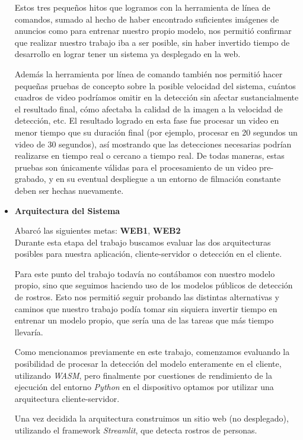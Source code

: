 \documentclass[a4paper]{article}
\begin{document}
\begin{itemize}
Estos tres pequeños hitos que logramos con la herramienta de línea de comandos, sumado al hecho de haber encontrado suficientes imágenes de anuncios como para entrenar nuestro propio modelo, nos permitió confirmar que realizar nuestro trabajo iba a ser posible, sin haber invertido tiempo de desarrollo en lograr tener un sistema ya desplegado en la web.

Además la herramienta por línea de comando también nos permitió hacer pequeñas pruebas de concepto sobre la posible velocidad del sistema, cuántos cuadros de video podríamos omitir en la detección sin afectar sustancialmente el resultado final, cómo afectaba la calidad de la imagen a la velocidad de detección, etc. El resultado logrado en esta fase fue procesar un video en menor tiempo que su duración final (por ejemplo, procesar en 20 segundos un video de 30 segundos), así mostrando que las detecciones necesarias podrían realizarse en tiempo real o cercano a tiempo real. De todas maneras, estas pruebas son únicamente válidas para el procesamiento de un video pre-grabado, y en su eventual despliegue a un entorno de filmación constante deben ser hechas nuevamente.

\item \textbf{Arquitectura del Sistema}

Abarcó las siguientes metas: \textbf{WEB1}, \textbf{WEB2} \\

Durante esta etapa del trabajo buscamos evaluar las dos arquitecturas posibles para nuestra aplicación, cliente-servidor o detección en el cliente.

Para este punto del trabajo todavía no contábamos con nuestro modelo propio, sino que seguimos haciendo uso de los modelos públicos de detección de rostros. Esto nos permitió seguir probando las distintas alternativas y caminos que nuestro trabajo podía tomar sin siquiera invertir tiempo en entrenar un modelo propio, que sería una de las tareas que más tiempo llevaría.

Como mencionamos previamente en este trabajo, comenzamos evaluando la posibilidad de procesar la detección del modelo enteramente en el cliente, utilizando \textit{WASM}, pero finalmente por cuestiones de rendimiento de la ejecución del entorno \textit{Python} en el dispositivo optamos por utilizar una arquitectura cliente-servidor.

Una vez decidida la arquitectura construimos un sitio web (no desplegado), utilizando el framework \textit{Streamlit}, que detecta rostros de personas.


\end{itemize}
\end{document}
